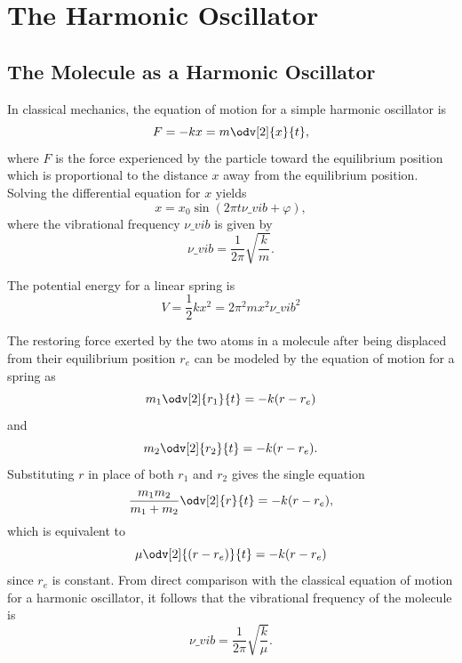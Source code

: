 \documentclass[11pt, twoside, fleqn]{report}
\begin{document}
\chapter{The Harmonic Oscillator}
\label{c:the_harmonic_oscillator}

\section{The Molecule as a Harmonic Oscillator}
\label{s:the_molecule_as_a_harmonic_oscillator}

In classical mechanics, the equation of motion for a simple harmonic oscillator is
\begin{equation*}
    F = -kx = m\odv[2]{x}{t},
\end{equation*}
where $F$ is the force experienced by the particle toward the equilibrium position which is proportional to the distance $x$ away from the equilibrium position. Solving the differential equation for $x$ yields
\begin{equation*}
    x = x_0\sin(2\pi t\nu\_{vib} + \varphi),
\end{equation*}
where the vibrational frequency $\nu\_{vib}$ is given by
\begin{equation*}
    \nu\_{vib} = \frac{1}{2\pi}\sqrt{\frac{k}{m}}.
\end{equation*}

The potential energy for a linear spring is
\begin{equation*}
    V = \frac{1}{2}kx^2 = 2\pi^2mx^2\nu\_{vib}^2
\end{equation*}

The restoring force exerted by the two atoms in a molecule after being displaced from their equilibrium position $r_e$ can be modeled by the equation of motion for a spring as
\begin{equation*}
    m_1\odv[2]{r_1}{t} = -k(r - r_e)
\end{equation*}
and
\begin{equation*}
    m_2\odv[2]{r_2}{t} = -k(r - r_e).
\end{equation*}
Substituting $r$ in place of both $r_1$ and $r_2$ gives the single equation
\begin{equation*}
    \frac{m_1m_2}{m_1 + m_2}\odv[2]{r}{t} = -k(r - r_e),
\end{equation*}
which is equivalent to
\begin{equation*}
    \mu\odv[2]{(r - r_e)}{t} = -k(r - r_e)
\end{equation*}
since $r_e$ is constant. From direct comparison with the classical equation of motion for a harmonic oscillator, it follows that the vibrational frequency of the molecule is
\begin{equation*}
    \nu\_{vib} = \frac{1}{2\pi}\sqrt{\frac{k}{\mu}}.
\end{equation*}
\end{document}
